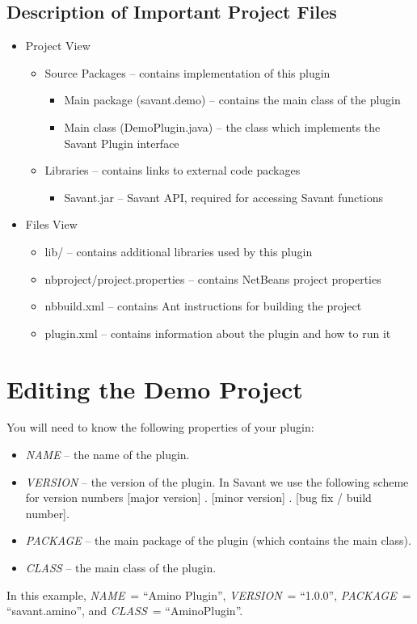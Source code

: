 \documentclass[times,11pt]{report}
\begin{document}
\subsection*{Description of Important Project Files}
\begin{itemize}
	\item Project View
	\begin{itemize}
		\item Source Packages -- contains implementation of this plugin
		\begin{itemize}
			\item Main package (savant.demo) -- contains the main class of the plugin
			\item Main class (DemoPlugin.java) -- the class which implements the Savant Plugin interface
		\end{itemize}
		\item Libraries -- contains links to external code packages
		\begin{itemize}
			\item Savant.jar -- Savant API, required for accessing Savant functions
		\end{itemize}
	\end{itemize}
	\item Files View
	\begin{itemize}
		\item lib/ -- contains additional libraries used by this plugin
		\item nbproject/project.properties -- contains NetBeans project properties
		\item nbbuild.xml -- contains Ant instructions for building the project
		\item plugin.xml -- contains information about the plugin and how to run it
	\end{itemize}
\end{itemize}

\section{Editing the Demo Project}
You will need to know the following properties of your plugin:
\begin{itemize}
	\item \textit{NAME} -- the name of the plugin.
	\item \textit{VERSION} -- the version of the plugin. In Savant we use the following scheme for version numbers [major version] . [minor version] . [bug fix / build number].
	\item \textit{PACKAGE} -- the main package of the plugin (which contains the main class).
	\item \textit{CLASS} -- the main class of the plugin.
\end{itemize}
In this example, \textit{NAME}~= ``Amino Plugin'', \textit{VERSION}~= ``1.0.0'', \textit{PACKAGE}~= ``savant.amino'', and \textit{CLASS}~= ``AminoPlugin''.
\end{document}
